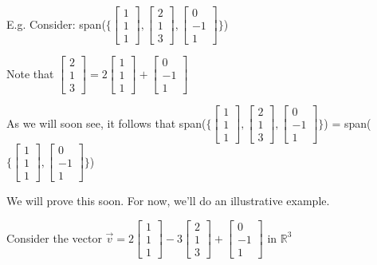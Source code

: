 \documentclass{letter}
\begin{document}
	E.g. Consider: span($\{ \begin{bmatrix}1\\1\\1\end{bmatrix}, \begin{bmatrix}2\\1\\3\end{bmatrix}, \begin{bmatrix}0\\-1\\1\end{bmatrix} \}$)
	
	Note that $\begin{bmatrix}2\\1\\3\end{bmatrix} = 2\begin{bmatrix}1\\1\\1\end{bmatrix} + \begin{bmatrix}0\\-1\\1\end{bmatrix}$
	
	As we will soon see, it follows that span($\{ \begin{bmatrix}1\\1\\1\end{bmatrix}, \begin{bmatrix}2\\1\\3\end{bmatrix}, \begin{bmatrix}0\\-1\\1\end{bmatrix}\}$) = span($\{ \begin{bmatrix}1\\1\\1\end{bmatrix}, \begin{bmatrix}0\\-1\\1\end{bmatrix} \}$)
	
	We will prove this soon. For now, we'll do an illustrative example.
	
	Consider the vector $\vec v = 2\begin{bmatrix}1\\1\\1\end{bmatrix} - 3\begin{bmatrix}2\\1\\3\end{bmatrix} + \begin{bmatrix}0\\-1\\1\end{bmatrix}$ in $ \mathbb{R}^3$
	
\end{document}
